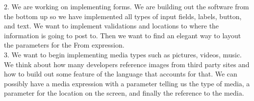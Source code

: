 \documentclass{article}
\begin{document}
2. We are working on implementing forms. We are building out the software from the bottom up so we have implemented all types of input fields, labels, button, and text. We want to implement validations and locations to where the information is going to post to. Then we want to find an elegant way to layout the parameters for the From expression.\\

3. We want to begin implementing media types such as pictures, videos, music. We think about how many developers reference images from third party sites and how to build out some feature of the language that accounts for that. We can possibly have a media expression with a parameter telling us the type of media, a parameter for the location on the screen, and finally the reference to the media.
\end{document}
